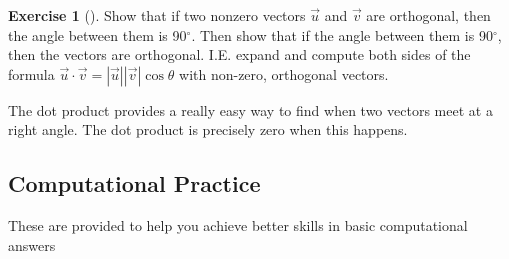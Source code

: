 \documentclass[10pt,]{book}
\theoremstyle{plain}
\theoremstyle{definition}
\theoremstyle{definition}
\theoremstyle{definition}
\theoremstyle{definition}
\newtheorem{exploration}[project]{Exercise}
\theoremstyle{definition}
\numberwithin{equation}{section}
\begin{document}
\begin{exploration}[]\label{exploration-36}
Show that if two nonzero vectors \(\vec u\) and \(\vec v\) are orthogonal, then the angle between them is 90\(^\circ\). Then show that if the angle between them is 90\(^\circ\), then the vectors are orthogonal. I.E. expand and compute both sides of the formula \(\vec u\cdot \vec v=|\vec u||\vec v|\cos\theta\) with non-zero, orthogonal vectors.%
\end{exploration}
The dot product provides a really easy way to find when two vectors meet at a right angle. The dot product is precisely zero when this happens.%
\typeout{************************************************}
\typeout{************************************************}
\subsection[{Computational Practice}]{Computational Practice}\label{exercises-2}
These are provided to help you achieve better skills in basic computational answers%
\end{document}
